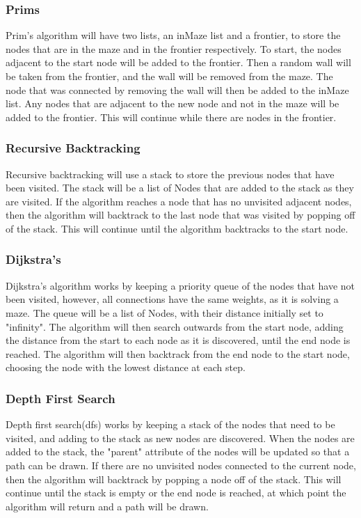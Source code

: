 \documentclass{article}
\begin{document}
\subsubsection{Prims}
Prim's algorithm will have two lists, an inMaze list and a frontier, to store the nodes that are in the maze and in the frontier respectively. To start, the nodes adjacent to the start node will be added to the frontier. Then a random wall will be taken from the frontier, and the wall will be removed from the maze. The node that was connected by removing the wall will then be added to the inMaze list. Any nodes that are adjacent to the new node and not in the maze will be added to the frontier. This will continue while there are nodes in the frontier.

\subsubsection{Recursive Backtracking}
Recursive backtracking will use a stack to store the previous nodes that have been visited. The stack will be a list of Nodes that are added to the stack as they are visited. If the algorithm reaches a node that has no unvisited adjacent nodes, then the algorithm will backtrack to the last node that was visited by popping off of the stack. This will continue until the algorithm backtracks to the start node.

\subsubsection{Dijkstra's}
Dijkstra's algorithm works by keeping a priority queue of the nodes that have not been visited, however, all connections have the same weights, as it is solving a maze. The queue will be a list of Nodes, with their distance initially set to "infinity". The algorithm will then search outwards from the start node, adding the distance from the start to each node as it is discovered, until the end node is reached. The algorithm will then backtrack from the end node to the start node, choosing the node with the lowest distance at each step.

\subsubsection{Depth First Search}
Depth first search(dfs) works by keeping a stack of the nodes that need to be visited, and adding to the stack as new nodes are discovered. When the nodes are added to the stack, the "parent" attribute of the nodes will be updated so that a path can be drawn. If there are no unvisited nodes connected to the current node, then the algorithm will backtrack by popping a node off of the stack. This will continue until the stack is empty or the end node is reached, at which point the algorithm will return and a path will be drawn.
\end{document}
